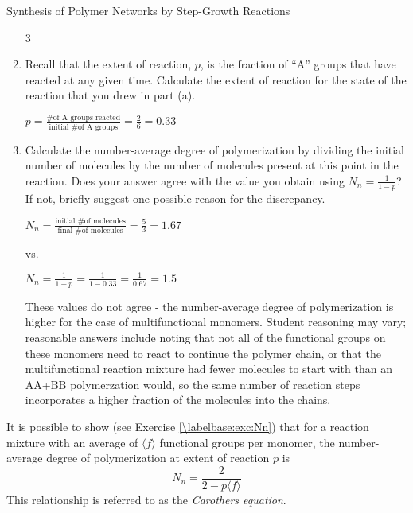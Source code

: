 \begin{activity}[extension]{Synthesis of Polymer Networks by Step-Growth Reactions}
\begin{ctqs}
\begin{enumerate}
				\begin{solution}[0.5in]
					3
				\end{solution}
				
			\item Recall that the extent of reaction, $p$, is the fraction of ``A'' groups that have reacted at any given time.  Calculate the extent of reaction for the state of the reaction that you drew in part (a).
			
				\begin{solution}[1.25in]
					$p = \frac{\text{\# of A groups reacted}}{\text{initial \# of A groups}} = \frac{2}{6} = 0.33$
				\end{solution}
				
			\item Calculate the number-average degree of polymerization by dividing the initial number of molecules by the number of molecules present at this point in the reaction.  Does your answer agree with the value you obtain using $N_n = \frac{1}{1-p}$?  If not, briefly suggest one possible reason for the discrepancy.
			
				\begin{solution}[2in]
					$N_n = \frac{\text{initial \# of molecules}}{\text{final \# of molecules}} = \frac{5}{3} = 1.67$
					
					vs.
					
					$N_n = \frac{1}{1-p} = \frac{1}{1-0.33} = \frac{1}{0.67} = 1.5$
					
					These values do not agree - the number-average degree of polymerization is higher for the case of multifunctional monomers.  Student reasoning may vary; reasonable answers include noting that not all of the functional groups on these monomers need to react to continue the polymer chain, or that the multifunctional reaction mixture had fewer molecules to start with than an AA+BB polymerzation would, so the same number of reaction steps incorporates a higher fraction of the molecules into the chains.
				\end{solution}
		\end{enumerate}
\end{ctqs}

\clearpage
\begin{infobox}
	It is possible to show (see Exercise \ref{\labelbase:exc:Nn}) that for a reaction mixture with an average of $\langle f\rangle$ functional groups per monomer, the number-average degree of polymerization at extent of reaction $p$ is
	\begin{equation*}
		N_n = \frac{2}{2-p\langle f \rangle} \label{\labelbase:eqn:carothers}
	\end{equation*}
	This relationship is referred to as the \emph{Carothers equation}.
\end{infobox}


\end{activity}
